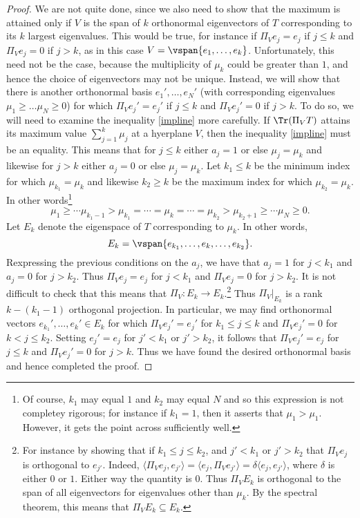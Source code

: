 \documentclass[12pt]{article}
\begin{document}
\begin{proof}
We are not quite done, since we also need to show that the maximum is attained only if $V$ is the span of $k$ orthonormal eigenvectors of $T$ corresponding to its $k$ largest eigenvalues. This would be true, for instance if $\Pi_V e_j = e_j$ if $j \leq k$ and $\Pi_V e_j = 0$ if $j > k$, as in this case $V = \vspan\{e_1,\ldots,e_k\}$. Unfortunately, this need not be the case, because the multiplicity of $\mu_k$ could be greater than $1$, and hence the choice of eigenvectors may not be unique. Instead, we will show that there is another orthonormal basis $e_1',\ldots, e_N'$ (with corresponding eigenvalues $\mu_1 \geq \ldots \mu_N \geq 0$) for which $\Pi_V e_j' = e_j'$ if $j \leq k$ and $\Pi_V e_j' = 0$ if $j > k$. To do so, we will need to examine the inequality \eqref{impline} more carefully. If $\Tr(\Pi_V T)$ attains its maximum value $\sum_{j=1}^k \mu_j$ at a hyerplane $V$, then the inequality \eqref{impline} must be an equality. This means that for $j \leq k$ either $a_j = 1$ or else $\mu_j = \mu_k$ and likewise for $j > k$ either $a_j = 0$ or else $\mu_j = \mu_k$. Let $k_1 \leq k$ be the minimum index for which $\mu_{k_1} = \mu_k$ and likewise $k_2 \geq k$ be the maximum index for which $\mu_{k_2} = \mu_k$. In other words\footnote{Of course, $k_1$ may equal $1$ and $k_2$ may equal $N$ and so this expression is not completey rigorous; for instance if $k_1 = 1$, then it asserts that $\mu_1 > \mu_1$. However, it gets the point across sufficiently well.}
 \[\mu_1 \geq \cdots \mu_{k_1-1} > \mu_{k_1} = \cdots = \mu_k = \cdots = \mu_{k_2} > \mu_{k_2+1} \geq \cdots \mu_{N} \geq 0.\]
Let $E_k$ denote the eigenspace of $T$ corresponding to $\mu_k$. In other words, \[E_k = \vspan\{e_{k_1},\ldots, e_k,\ldots,e_{k_2}\}.\]
Rexpressing the previous conditions on the $a_j$, we have that $a_j = 1$ for $j < k_1$ and $a_j = 0$ for $j > k_2$. Thus $\Pi_V e_j = e_j$ for $j < k_1$ and $\Pi_V e_j = 0$ for $j > k_2$.  It is not difficult to check that this means that $\Pi_V: E_k \to E_k$.\footnote{For instance by showing that if $k_1 \leq j \leq k_2$, and $j' < k_1$ or $j' > k_2$ that $\Pi_V e_j$ is orthogonal to $e_{j'}$. Indeed, $\langle \Pi_V e_j,e_{j'}\rangle = \langle e_j, \Pi_V e_{j'}\rangle = \delta \langle e_j,e_{j'}\rangle$, where $\delta$ is either $0$ or $1$. Either way the quantity is $0$. Thus $\Pi_V E_k$ is orthogonal to the span of all eigenvectors for eigenvalues other than $\mu_k$. By the spectral theorem, this means that $\Pi_V E_k \subseteq E_k$.} Thus $\Pi_V|_{E_k}$ is a rank $k - (k_1-1)$ orthogonal projection. In particular, we may find orthonormal vectors $e_{k_1}',\ldots, e_k' \in E_k$ for which $\Pi_V e_j'= e_j'$ for $k_1 \leq j \leq k$ and $\Pi_V e_j' = 0$ for $k < j \leq k_2$. Setting $e_j' = e_j$ for $j' < k_1$ or $j' > k_2$, it follows that $\Pi_V e_j' = e_j$ for $j \leq k$ and $\Pi_V e_j' = 0$ for $j > k$. Thus we have found the desired orthonormal basis and hence completed the proof. \end{proof}
\end{document}
